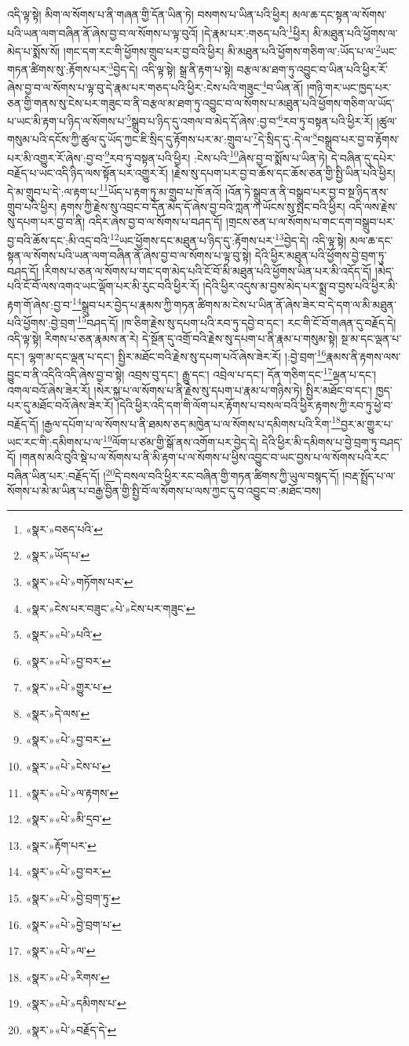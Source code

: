 འདི་ལྟ་སྟེ། མིག་ལ་སོགས་པ་ནི་གཞན་གྱི་དོན་ཡིན་ཏེ། བསགས་པ་ཡིན་པའི་ཕྱིར། མལ་ཆ་དང་སྟན་ལ་སོགས་པའི་ཡན་ལག་བཞིན་ནོ་ཞེས་བྱ་བ་ལ་སོགས་པ་ལྟ་བུའོ། །དེ་རྣམ་པར་:གཅད་པའི་\footnote{«སྣར་»བཅད་པའི་}ཕྱིར། མི་མཐུན་པའི་ཕྱོགས་ལ་མེད་པ་སྨོས་སོ། །གང་དག་རང་གི་ཕྱོགས་གྲུབ་པར་བྱ་བའི་ཕྱིར། མི་མཐུན་པའི་ཕྱོགས་གཅིག་ལ་:ཡོད་པ་ལ་\footnote{«སྣར་»ཡོད་པ་}ཡང་གཏན་ཚིགས་སུ་:རྟོགས་པར་\footnote{«སྣར་»«པེ་»གཏོགས་པར་}བྱེད་དེ། འདི་ལྟ་སྟེ། སྒྲ་ནི་རྟག་པ་སྟེ། བརྩལ་མ་ཐག་ཏུ་འབྱུང་བ་ཡིན་པའི་ཕྱིར་རོ་ཞེས་བྱ་བ་ལ་སོགས་པ་ལྟ་བུ་དེ་རྣམ་པར་གཅད་པའི་ཕྱིར་:ངེས་པའི་གཟུང་\footnote{«སྣར་»ངེས་པར་བཟུང་«པེ་»ངེས་པར་གཟུང་}བ་ཡིན་ནོ། །གཉི་གར་ཡང་ཁྱད་པར་ཅན་གྱི་གནས་སུ་ངེས་པར་གཟུང་བ་ནི་བརྩལ་མ་ཐག་ཏུ་འབྱུང་བ་ལ་སོགས་པ་མཐུན་པའི་ཕྱོགས་གཅིག་ལ་ཡོད་པ་ཡང་མི་རྟག་པ་ཉིད་ལ་སོགས་པ་\footnote{«སྣར་»«པེ་»པའི་}སྒྲུབ་པ་ཉིད་དུ་འགལ་བ་མེད་དོ་ཞེས་:བྱ་བ་\footnote{«སྣར་»«པེ་»བྱ་བར་}རབ་ཏུ་བསྟན་པའི་ཕྱིར་རོ། །ཚུལ་གསུམ་པའི་དངོས་ཀྱི་ཚུལ་དུ་ཡོད་ཀྱང་ཇི་སྲིད་དུ་རྟོགས་པར་མ་:གྲུབ་པ་\footnote{«སྣར་»«པེ་»གྱུར་པ་}དེ་སྲིད་དུ་:དེ་ལ་\footnote{«སྣར་»དེ་ལས་}བསྒྲུབ་པར་བྱ་བ་རྟོགས་པར་མི་འགྱུར་རོ་ཞེས་:བྱ་བ་\footnote{«སྣར་»«པེ་»བྱ་བར་}རབ་ཏུ་བསྟན་པའི་ཕྱིར། :ངེས་པའི་\footnote{«སྣར་»«པེ་»ངེས་པ་}ཞེས་བྱ་བ་སྨོས་པ་ཡིན་ཏེ། དེ་བཞིན་དུ་དཔེར་བརྗོད་པ་ཡང་འདི་ཉིད་ལས་སྟོན་པར་འགྱུར་རོ། །རྗེས་སུ་དཔག་པར་བྱ་བ་ཆོས་དང་ཆོས་ཅན་གྱི་སྤྱི་ཡིན་པའི་ཕྱིར། དེ་མ་གྲུབ་པ་དེ་:ལ་རྟག་པ་\footnote{«སྣར་»«པེ་»ལ་རྟགས་}ཡོད་པ་རྟག་ཏུ་མ་གྲུབ་པ་ཁོ་ནའོ། །འོན་ཏེ་སྒྲུབ་ན་ནི་བསྒྲུབ་པར་བྱ་བ་སྔ་ཉིད་ནས་གྲུབ་པའི་ཕྱིར། རྟགས་ཀྱི་རྗེས་སུ་འབྲང་བ་དོན་མེད་དོ་ཞེས་བྱ་བའི་ཀླན་ཀ་ཡོངས་སུ་སྤང་བའི་ཕྱིར། འདི་ལས་རྗེས་སུ་དཔག་པར་བྱ་བ་ནི། འདིར་ཞེས་བྱ་བ་ལ་སོགས་པ་བཤད་དོ། །གྲངས་ཅན་པ་ལ་སོགས་པ་གང་དག་བསྒྲུབ་པར་བྱ་བའི་ཆོས་དང་:མི་འདྲ་བའི་\footnote{«སྣར་»«པེ་»མི་དྲབ་}ཡང་ཕྱོགས་དང་མཐུན་པ་ཉིད་དུ་:རྟོགས་པར་\footnote{«སྣར་»རྟོག་པར་}བྱེད་དེ། འདི་ལྟ་སྟེ། མལ་ཆ་དང་སྟན་ལ་སོགས་པའི་ཡན་ལག་བཞིན་ནོ་ཞེས་བྱ་བ་ལ་སོགས་པ་ལྟ་བུ་སྟེ། དེའི་ཕྱིར་མཐུན་པའི་ཕྱོགས་བྱེ་བྲག་ཏུ་བཤད་དོ། །རིགས་པ་ཅན་ལ་སོགས་པ་གང་དག་མེད་པའི་ངོ་བོ་མི་མཐུན་པའི་ཕྱོགས་ཡིན་པར་མི་འདོད་དོ། །མེད་པའི་ངོ་བོ་ལས་འགའ་ཡང་ལྡོག་པར་མི་རུང་བའི་ཕྱིར་རོ། །དེའི་ཕྱིར་འདུས་མ་བྱས་མེད་པར་སྨྲ་བ་བྱས་པའི་ཕྱིར་མི་རྟག་གོ་ཞེས་:བྱ་བ་\footnote{«སྣར་»«པེ་»བྱ་བར་}སྒྲུབ་པར་བྱེད་པ་རྣམས་ཀྱི་གཏན་ཚིགས་མ་ངེས་པ་ཡིན་ནོ་ཞེས་ཟེར་བ་དེ་དག་ལ་མི་མཐུན་པའི་ཕྱོགས་:བྱེ་བྲག་\footnote{«སྣར་»«པེ་»བྱེ་བྲག་ཏུ་}བཤད་དོ། །ཁ་ཅིག་རྗེས་སུ་དཔག་པའི་རབ་ཏུ་དབྱེ་བ་དང་། རང་གི་ངོ་བོ་གཞན་དུ་བརྗོད་དེ། འདི་ལྟ་སྟེ། རིགས་པ་ཅན་རྣམས་ན་རེ། དེ་སྔོན་དུ་འགྲོ་བའི་རྗེས་སུ་དཔག་པ་ནི་རྣམ་པ་གསུམ་སྟེ། སྔ་མ་དང་ལྡན་པ་དང་། ལྷག་མ་དང་ལྡན་པ་དང་། སྤྱིར་མཐོང་བའི་རྗེས་སུ་དཔག་པའོ་ཞེས་ཟེར་རོ། །:བྱེ་བྲག་\footnote{«སྣར་»«པེ་»བྱེ་བྲག་པ་}རྣམས་ནི་རྟགས་ལས་བྱུང་བ་ནི་འདིའི་འདི་ཞེས་བྱ་བ་སྟེ། འབྲས་བུ་དང་། རྒྱུ་དང་། འབྲེལ་པ་དང་། དོན་གཅིག་དང་\footnote{«སྣར་»«པེ་»ལ་}ལྡན་པ་དང་། འགལ་བའོ་ཞེས་ཟེར་རོ། །སེར་སྐྱ་པ་ལ་སོགས་པ་ནི་རྗེས་སུ་དཔག་པ་རྣམ་པ་གཉིས་ཏེ། སྤྱིར་མཐོང་བ་དང་། ཁྱད་པར་དུ་མཐོང་བའོ་ཞེས་ཟེར་རོ། །དེའི་ཕྱིར་འདི་དག་གི་ལོག་པར་རྟོགས་པ་བསལ་བའི་ཕྱིར་རྟགས་ཀྱི་རབ་ཏུ་ཕྱེ་བ་བརྗོད་དོ། །རྒྱལ་དཔོག་པ་ལ་སོགས་པ་ནི་ཐམས་ཅད་མཁྱེན་པ་ལ་སོགས་པ་དམིགས་པའི་རིག་\footnote{«སྣར་»«པེ་»རིགས་}བྱར་མ་གྱུར་པ་ཡང་རང་གི་:དམིགས་པ་ལ་\footnote{«སྣར་»«པེ་»དམིགས་པ་}ལོག་པ་ཙམ་གྱི་སྒོ་ནས་འགོག་པར་བྱེད་དེ། དེའི་ཕྱིར་མི་དམིགས་པ་བྱེ་བྲག་ཏུ་བཤད་དོ། །གནས་མའི་བུའི་སྡེ་པ་ལ་སོགས་པ་ནི་མི་རྟག་པ་ལ་སོགས་པ་ཕྱིས་འབྱུང་བ་ཡང་བྱས་པ་ལ་སོགས་པའི་རང་བཞིན་ཡིན་པར་:བརྗོད་དོ། །\footnote{«སྣར་»«པེ་»བརྗོད་དེ་}དེ་བསལ་བའི་ཕྱིར་རང་བཞིན་གྱི་གཏན་ཚིགས་ཀྱི་ཡུལ་བསྙད་དོ། །བརྡ་སྤྲོད་པ་ལ་སོགས་པ་མེ་མ་ཡིན་པ་བརྒྱ་བྱིན་གྱི་སྤྱི་བོ་ལ་སོགས་པ་ལས་ཀྱང་དུ་བ་འབྱུང་བ་:མཐོང་བས། 